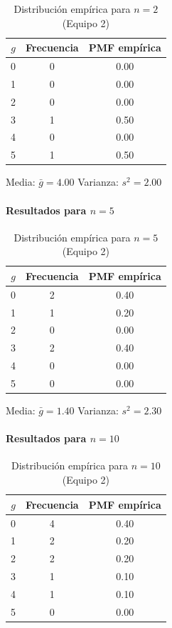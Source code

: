 \begin{table}[H]
\centering
\begin{tabular}{ccc}
\toprule
\(g\) & Frecuencia & PMF empírica \\
\midrule
0 & 0 & 0.00 \\
1 & 0 & 0.00 \\
2 & 0 & 0.00 \\
3 & 1 & 0.50 \\
4 & 0 & 0.00 \\
5 & 1 & 0.50 \\
\bottomrule
\end{tabular}
\caption{Distribución empírica para \(n=2\) (Equipo 2)}
\end{table}

Media: \(\bar{g}=4.00\) \quad Varianza: \(s^2=2.00\)

\paragraph{\texorpdfstring{Resultados para \(n=5\)}{Resultados para n=5}}

\begin{table}[H]
\centering
\begin{tabular}{ccc}
\toprule
\(g\) & Frecuencia & PMF empírica \\
\midrule
0 & 2 & 0.40 \\
1 & 1 & 0.20 \\
2 & 0 & 0.00 \\
3 & 2 & 0.40 \\
4 & 0 & 0.00 \\
5 & 0 & 0.00 \\
\bottomrule
\end{tabular}
\caption{Distribución empírica para \(n=5\) (Equipo 2)}
\end{table}

Media: \(\bar{g}=1.40\) \quad Varianza: \(s^2=2.30\)

\paragraph{\texorpdfstring{Resultados para \(n=10\)}{Resultados para n=10}}

\begin{table}[H]
\centering
\begin{tabular}{ccc}
\toprule
\(g\) & Frecuencia & PMF empírica \\
\midrule
0 & 4 & 0.40 \\
1 & 2 & 0.20 \\
2 & 2 & 0.20 \\
3 & 1 & 0.10 \\
4 & 1 & 0.10 \\
5 & 0 & 0.00 \\
\bottomrule
\end{tabular}
\caption{Distribución empírica para \(n=10\) (Equipo 2)}
\end{table}


